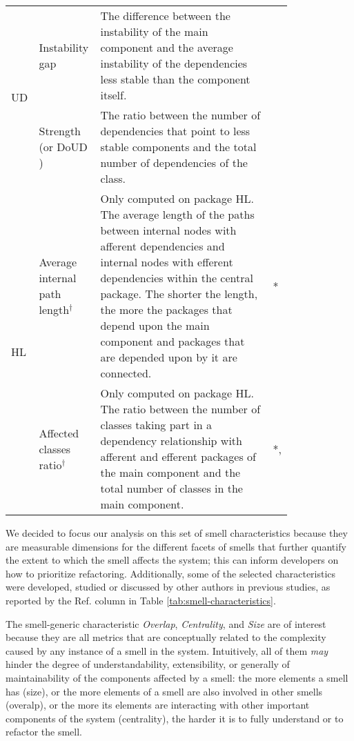 \begin{table}[]
\begin{tabular}{p{0.035\linewidth}p{0.15\linewidth}p{0.60\linewidth}p{0.025\linewidth}}
     \multirow{2}{0.1\linewidth}{UD} & Instability gap & The difference between the instability of the main component and the average instability of the dependencies less stable than the component itself. & \cite{Arcelli2017} \\
     & Strength (or DoUD \cite{Arcelli2017}) & The ratio between the number of dependencies that point to less stable components and the total number of dependencies of the class. & \cite{Arcelli2017} \\ \midrule
     \multirow{3}{0.1\linewidth}{HL} & Average internal path length$^\dagger$ & Only computed on package HL. The average length of the paths between internal nodes with afferent dependencies and internal nodes with efferent dependencies within the central package. The shorter the length, the more the packages that depend upon the main component and packages that are depended upon by it are connected. & * \\
     & Affected classes ratio$^\dagger$ & Only computed on package HL. The ratio between the number of classes taking part in a dependency relationship with afferent and efferent packages of the main component and the total number of classes in the main component. & *, \cite{Abdeen2011} \\\bottomrule
    \end{tabular}
\end{table}

We decided to focus our analysis on this set of smell characteristics because they are measurable dimensions for the different facets of smells that further quantify the extent to which the smell affects the system; this can  inform developers on how to prioritize refactoring.
Additionally, some of the selected characteristics were developed, studied or discussed by other authors in previous studies, as reported by the Ref. column in Table \ref{tab:smell-characteristics}.

The smell-generic characteristic \emph{Overlap}, \emph{Centrality}, and \emph{Size} are of interest because they are all metrics that are conceptually related to the complexity caused by any instance of a smell in the system. Intuitively, all of them \emph{may} hinder the degree of understandability, extensibility, or generally of maintainability of the components affected by a smell: the more elements a smell has (size), or the more elements of a smell are also involved in other smells (overalp), or the more its elements are interacting with other important components of the system (centrality), the harder it is to fully understand or to refactor the smell. 

